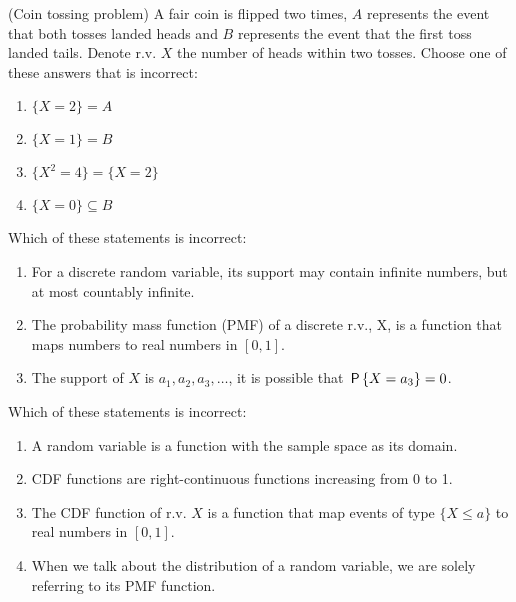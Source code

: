 \documentclass[poll_tutorial_format]{subfiles}
\begin{document}
	
	
	\begin{exercise}
		(Coin tossing problem) A fair coin is flipped two times, $A$ represents the event that both tosses landed heads and $B$ represents the event that the first toss landed tails. Denote r.v. $X$ the number of heads within two tosses.
		Choose one of these answers that is incorrect: 
		\begin{enumerate}
			\item $\{X=2\}=A$
			\item $ \{X=1\}=B$
			\item $\{X^2 =4\} =\{X=2\} $
			\item $ \{X=0\} \subseteq B$
		\end{enumerate}
	\end{exercise}
	
	
	
	\begin{exercise}
			Which of these statements is incorrect:
		\begin{enumerate}
			\item For a discrete random variable, its support may contain infinite numbers, but at most countably infinite.
			\item The probability mass function (PMF) of a discrete r.v., X, is a function that maps numbers  to real numbers in $[0,1]$.
			\item The support of $X$ is $a_1, a_2, a_3, \dots$, it is possible that $\P{X=a_{3}}=0$.
		\end{enumerate}
	\end{exercise}
	
	
		\begin{exercise}
		Which of these statements is incorrect:
		\begin{enumerate}
			\item A random variable is a function with the sample space as its domain. 
			\item CDF functions are right-continuous functions increasing from 0 to 1.
			\item The CDF function of r.v. $X$ is a function that map events of type $\{X\leq a\}$ to real numbers in $[0,1]$.
			\item When we talk about the distribution of a random variable, we are solely referring to its PMF function.
		\end{enumerate}
	\end{exercise}
	
 		
		
\end{document}
